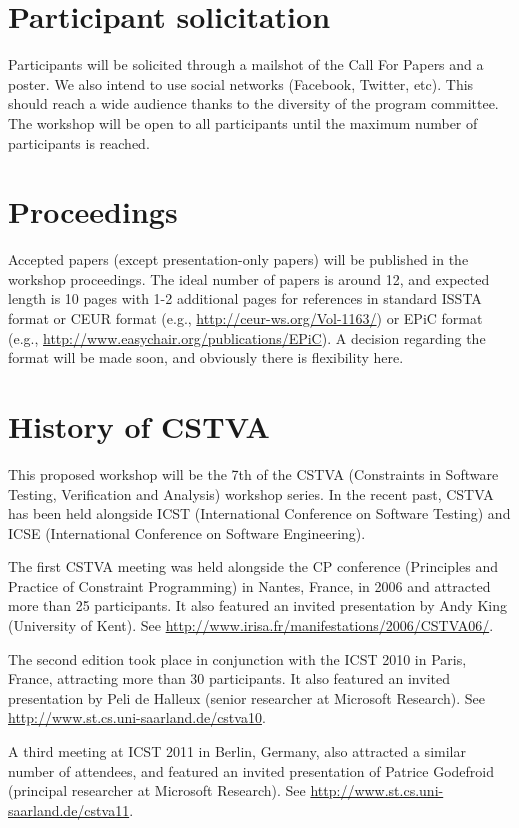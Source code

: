 \documentclass{sig-alternate}
\begin{document}
\section{Participant solicitation}

Participants will be solicited through a mailshot of the Call For Papers and a
poster. We also intend to use social networks (Facebook, Twitter, etc). This
should reach a wide audience thanks to the diversity of the program committee.
The workshop will be open to all participants until the maximum number of
participants is reached. 

\section{Proceedings}

Accepted papers (except presentation-only papers) will be published in the
workshop proceedings.  The ideal number of papers is around 12, and expected
length is 10 pages with 1-2 additional pages for references in standard ISSTA
format or 
CEUR format (e.g., \url{http://ceur-ws.org/Vol-1163/}) or
EPiC format (e.g., \url{http://www.easychair.org/publications/EPiC}). A decision regarding the format will be made soon, and obviously there is flexibility here.

\section{History of CSTVA}

This proposed workshop will be the 7th of the CSTVA (Constraints in Software
Testing, Verification and Analysis) workshop series. In the recent past, CSTVA
has been held alongside ICST (International Conference on Software Testing) and
ICSE (International Conference on Software Engineering).  

The first CSTVA meeting was held alongside the CP conference (Principles and
Practice of Constraint Programming) in Nantes, France, in 2006 and attracted
more than 25 participants. It also featured an invited presentation by Andy
King (University of Kent).
See \url{http://www.irisa.fr/manifestations/2006/CSTVA06/}.

The second edition took place in conjunction with the ICST 2010 in Paris,
France, attracting more than 30 participants. It also featured an invited
presentation by Peli de Halleux (senior researcher at Microsoft Research).  
See \url{http://www.st.cs.uni-saarland.de/cstva10}. 

A third meeting at ICST 2011 in Berlin, Germany, also attracted a similar
number of attendees, and featured an invited presentation of Patrice Godefroid
(principal researcher at Microsoft Research).  
See \url{http://www.st.cs.uni-saarland.de/cstva11}.
\end{document}
